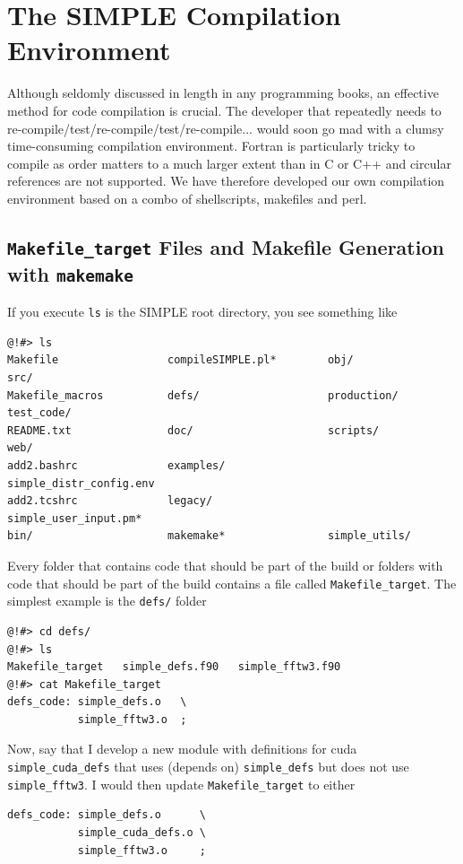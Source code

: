 \documentclass[a4paper,11pt]{article}
\begin{document}
\section{The SIMPLE Compilation Environment}
Although seldomly discussed in length in any programming books, an effective method for code compilation is crucial. The developer that repeatedly needs to re-compile/test/re-compile/test/re-compile... would soon go mad with a clumsy time-consuming compilation environment. Fortran is particularly tricky to compile as order matters to a much larger extent than in C or C++ and circular references are not supported. We have therefore developed our own compilation environment based on a combo of shellscripts, makefiles and perl. 

\subsection{\texttt{Makefile\_target} Files and Makefile Generation with \texttt{makemake}}
If you execute \texttt{ls} is the SIMPLE root directory, you see something like
\begin{verbatim}
@!#> ls
Makefile                 compileSIMPLE.pl*        obj/                     src/
Makefile_macros          defs/                    production/              test_code/
README.txt               doc/                     scripts/                 web/
add2.bashrc              examples/                simple_distr_config.env
add2.tcshrc              legacy/                  simple_user_input.pm*
bin/                     makemake*                simple_utils/
\end{verbatim}
Every folder that contains code that should be part of the build or folders with code that should be part of the build contains a file called \texttt{Makefile\_target}. The simplest example is the \texttt{defs/} folder
\begin{verbatim}
@!#> cd defs/
@!#> ls
Makefile_target   simple_defs.f90   simple_fftw3.f90
@!#> cat Makefile_target 
defs_code: simple_defs.o   \
           simple_fftw3.o  ;
\end{verbatim}
Now, say that I develop a new module with definitions for cuda \texttt{simple\_cuda\_defs} that uses (depends on) \texttt{simple\_defs} but does not use \texttt{simple\_fftw3}. I would then update \texttt{Makefile\_target} to either
\begin{verbatim}
defs_code: simple_defs.o      \
           simple_cuda_defs.o \
           simple_fftw3.o     ;
\end{verbatim}
\end{document}
